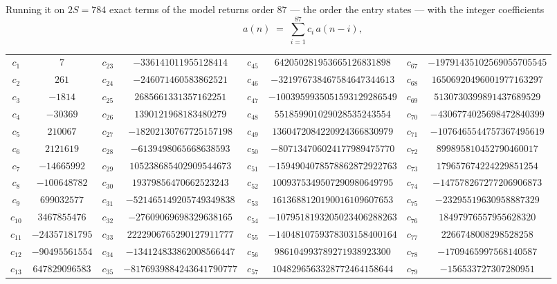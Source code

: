 \documentclass[11pt,a4paper]{article}
\theoremstyle{plain}
\theoremstyle{definition}
\begin{document}
Running it on $2S=784$ exact terms of the model returns order $87$ --- the order the
entry states --- with the integer coefficients
\[
a(n)\;=\;\sum_{i=1}^{87}c_i\,a(n-i),
\]
\begin{center}\small
\begin{tabular}{cccccccc}
$c_{1}$ & $7$ & $c_{23}$ & $-336141011955128414$ & $c_{45}$ & $642050281953665126831898$ & $c_{67}$ & $-19791435102569055705545$ \\
$c_{2}$ & $261$ & $c_{24}$ & $-246071460583862521$ & $c_{46}$ & $-321976738467584647344613$ & $c_{68}$ & $16506920496001977163297$ \\
$c_{3}$ & $-1814$ & $c_{25}$ & $2685661331357162251$ & $c_{47}$ & $-1003959935051593129286549$ & $c_{69}$ & $5130730399891437689529$ \\
$c_{4}$ & $-30369$ & $c_{26}$ & $1390121968183480279$ & $c_{48}$ & $551859901029028535243554$ & $c_{70}$ & $-4306774025698472840399$ \\
$c_{5}$ & $210067$ & $c_{27}$ & $-18202130767725157198$ & $c_{49}$ & $1360472084220924366830979$ & $c_{71}$ & $-1076465544757367495619$ \\
$c_{6}$ & $2121619$ & $c_{28}$ & $-6139498065668638593$ & $c_{50}$ & $-807134706024177989475770$ & $c_{72}$ & $899895810452790460017$ \\
$c_{7}$ & $-14665992$ & $c_{29}$ & $105238685402909544673$ & $c_{51}$ & $-1594904078578862872922763$ & $c_{73}$ & $179657674224229851254$ \\
$c_{8}$ & $-100648782$ & $c_{30}$ & $19379856470662523243$ & $c_{52}$ & $1009375349507290980649795$ & $c_{74}$ & $-147578267277206906873$ \\
$c_{9}$ & $699032577$ & $c_{31}$ & $-521465149205749349838$ & $c_{53}$ & $1613688120190016109607653$ & $c_{75}$ & $-23295519630958887329$ \\
$c_{10}$ & $3467855476$ & $c_{32}$ & $-27609069698329638165$ & $c_{54}$ & $-1079518193205023406288263$ & $c_{76}$ & $18497976557955628320$ \\
$c_{11}$ & $-24357181795$ & $c_{33}$ & $2222906765290127911777$ & $c_{55}$ & $-1404810759378303158400164$ & $c_{77}$ & $2266748008298528258$ \\
$c_{12}$ & $-90495561554$ & $c_{34}$ & $-134124833862008566447$ & $c_{56}$ & $986104993789271938923300$ & $c_{78}$ & $-1709465997568140587$ \\
$c_{13}$ & $647829096583$ & $c_{35}$ & $-8176939884243641790777$ & $c_{57}$ & $1048296563328772464158644$ & $c_{79}$ & $-156533727307280951$ \\

\end{tabular}
\end{center}
\end{document}
